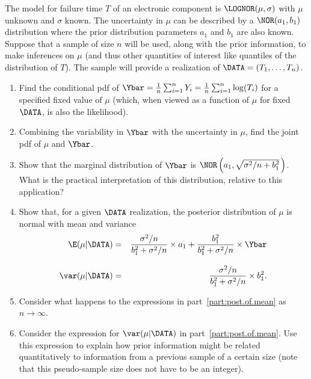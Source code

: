 \begin{exercise1}
\label{exercise:lognormal.bayes}
The model for failure time $T$ of an electronic component is
$\LOGNOR(\mu,\sigma)$ with $\mu$ unknown and $\sigma$ known.  The
uncertainty in $\mu$ can be described by a $\NOR(a_{1},b_{1})$
distribution where the prior distribution parameters $a_{1}$ and
$b_{1}$ are also known.  Suppose that a sample of size $n$ will be
used, along with the prior information, to make inferences on $\mu$
(and thus other quantities of interest like quantiles of the
distribution of $T$). The sample will provide a realization of
$\DATA=(T_{1},\ldots, T_{n})$.
\begin{enumerate}
\item
Find the conditional pdf of
$\Ybar = \frac{1}{n}\sum_{i=1}^{n} Y_{i} 
	=  \frac{1}{n}\sum_{i=1}^{n} \log(T_{i})$
for a specified fixed value of $\mu$ (which, when viewed as a function
of $\mu$ for fixed $\DATA$, is also the likelihood).
\item
Combining the variability in $\Ybar$ with the uncertainty in $\mu$,
find the joint pdf of $\mu$ and $\Ybar$. 
\item
Show that the marginal distribution of $\Ybar$ is $\NOR \left( a_{1},
\sqrt{\sigma^{2}/n+b_{1}^{2}} \, \right) $.  What is the practical interpretation
of this distribution, relative to this application?
\item
\label{part:post.of.mean}
Show that, for a given $\DATA$ realization, the posterior distribution
of $\mu$ is normal with mean and variance
\begin{eqnarray*}
\E(\mu | \DATA) &=&  \frac{\sigma^{2}/n   }{b_{1}^{2} 
	+ \sigma^{2}/n } \times a_{1}
	+\frac{b_{1}^{2}}{b_{1}^{2} 
	+ \sigma^{2}/n } \times \Ybar 
   \\[2ex]
   \var(\mu | \DATA) &=& \frac{\sigma^{2}/n   }{b_{1}^{2} 
	+ \sigma^{2}/n }\times b_{1}^{2}.
\end{eqnarray*}
\item
Consider what happens to the expressions in
part~\ref{part:post.of.mean}
as $n \rightarrow \infty$.
\item
Consider the expression for $\var(\mu | \DATA)$ in
part~\ref{part:post.of.mean}. Use this expression to explain how prior
information might be related quantitatively to information from a
previous sample of a certain size (note that this pseudo-sample size
does not have to be an integer).
\end{enumerate}
\end{exercise1}

